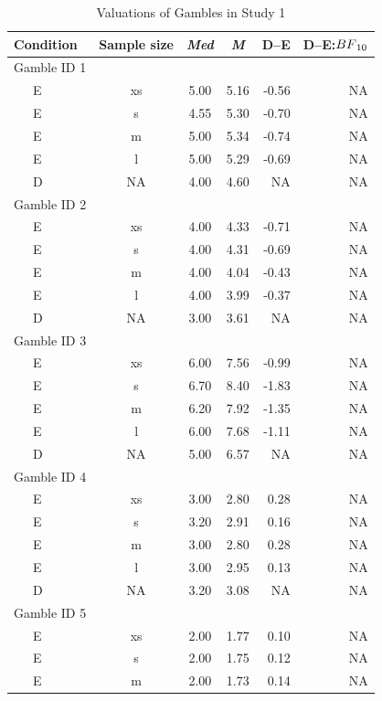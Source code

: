 \documentclass[a4paper, man, floatsintext]{apa6}
\begin{document}
\begin{table}[tbp]
\begin{center}
\begin{threeparttable}
\caption{\label{tab:means_study1}Valuations of Gambles in Study 1}
\begin{tabular}{lcccrr}
\toprule
Condition & Sample size & \textit{Med} & \textit{M} & D--E & D--E:$BF\textsubscript{10}$\\
\midrule
Gamble ID 1 &  &  &  &  & \\
\ \ \ E & xs & 5.00 & 5.16 & -0.56 & NA\\
\ \ \ E & s & 4.55 & 5.30 & -0.70 & NA\\
\ \ \ E & m & 5.00 & 5.34 & -0.74 & NA\\
\ \ \ E & l & 5.00 & 5.29 & -0.69 & NA\\
\ \ \ D & NA & 4.00 & 4.60 & NA & NA\\
Gamble ID 2 &  &  &  &  & \\
\ \ \ E & xs & 4.00 & 4.33 & -0.71 & NA\\
\ \ \ E & s & 4.00 & 4.31 & -0.69 & NA\\
\ \ \ E & m & 4.00 & 4.04 & -0.43 & NA\\
\ \ \ E & l & 4.00 & 3.99 & -0.37 & NA\\
\ \ \ D & NA & 3.00 & 3.61 & NA & NA\\
Gamble ID 3 &  &  &  &  & \\
\ \ \ E & xs & 6.00 & 7.56 & -0.99 & NA\\
\ \ \ E & s & 6.70 & 8.40 & -1.83 & NA\\
\ \ \ E & m & 6.20 & 7.92 & -1.35 & NA\\
\ \ \ E & l & 6.00 & 7.68 & -1.11 & NA\\
\ \ \ D & NA & 5.00 & 6.57 & NA & NA\\
Gamble ID 4 &  &  &  &  & \\
\ \ \ E & xs & 3.00 & 2.80 & 0.28 & NA\\
\ \ \ E & s & 3.20 & 2.91 & 0.16 & NA\\
\ \ \ E & m & 3.00 & 2.80 & 0.28 & NA\\
\ \ \ E & l & 3.00 & 2.95 & 0.13 & NA\\
\ \ \ D & NA & 3.20 & 3.08 & NA & NA\\
Gamble ID 5 &  &  &  &  & \\
\ \ \ E & xs & 2.00 & 1.77 & 0.10 & NA\\
\ \ \ E & s & 2.00 & 1.75 & 0.12 & NA\\
\ \ \ E & m & 2.00 & 1.73 & 0.14 & NA\\

\end{tabular}
\end{threeparttable}
\end{center}
\end{table}
\end{document}
